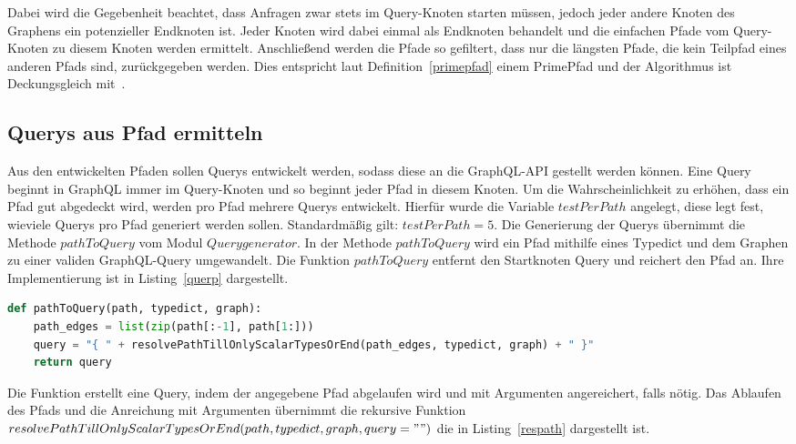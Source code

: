 Dabei wird die Gegebenheit beachtet, dass Anfragen zwar stets im Query-Knoten starten müssen, jedoch jeder andere Knoten des Graphens ein potenzieller Endknoten ist.
Jeder Knoten wird dabei einmal als Endknoten behandelt und die einfachen Pfade vom Query-Knoten zu diesem Knoten werden ermittelt.
Anschließend werden die Pfade so gefiltert, dass nur die längsten Pfade, die kein Teilpfad eines anderen Pfads sind, zurückgegeben werden.
Dies entspricht laut Definition~\ref{primepfad} einem PrimePfad und der Algorithmus ist Deckungsgleich mit~\cite[Finding Prime Test Paths S. 39]{software-testing}.

\newpage
\subsection{Querys aus Pfad ermitteln}

Aus den entwickelten Pfaden sollen Querys entwickelt werden, sodass diese an die GraphQL-API gestellt werden können.
Eine Query beginnt in GraphQL immer im Query-Knoten und so beginnt jeder Pfad in diesem Knoten.
Um die Wahrscheinlichkeit zu erhöhen, dass ein Pfad gut abgedeckt wird, werden pro Pfad mehrere Querys entwickelt.
Hierfür wurde die Variable $testPerPath$ angelegt, diese legt fest, wieviele Querys pro Pfad generiert werden sollen.
Standardmäßig gilt: $testPerPath = 5$.
Die Generierung der Querys übernimmt die Methode $pathToQuery$ vom Modul $Querygenerator$.
In der Methode $pathToQuery$ wird ein Pfad mithilfe eines Typedict und dem Graphen zu einer validen GraphQL-Query umgewandelt.
Die Funktion $pathToQuery$ entfernt den Startknoten Query und reichert den Pfad an.
Ihre Implementierung ist in Listing~\ref{querp} dargestellt.

\begin{lstlisting}[language=Python, caption={Funktion pathToQuery}, label={querp}]
def pathToQuery(path, typedict, graph):
    path_edges = list(zip(path[:-1], path[1:]))
    query = "{ " + resolvePathTillOnlyScalarTypesOrEnd(path_edges, typedict, graph) + " }"
    return query
\end{lstlisting}

Die Funktion erstellt eine Query, indem der angegebene Pfad abgelaufen wird und mit Argumenten angereichert, falls nötig.
Das Ablaufen des Pfads und die Anreichung mit Argumenten übernimmt die rekursive Funktion \\
$resolvePathTillOnlyScalarTypesOrEnd(path, typedict, graph, query="")$ die in Listing~\ref{respath} dargestellt ist.

